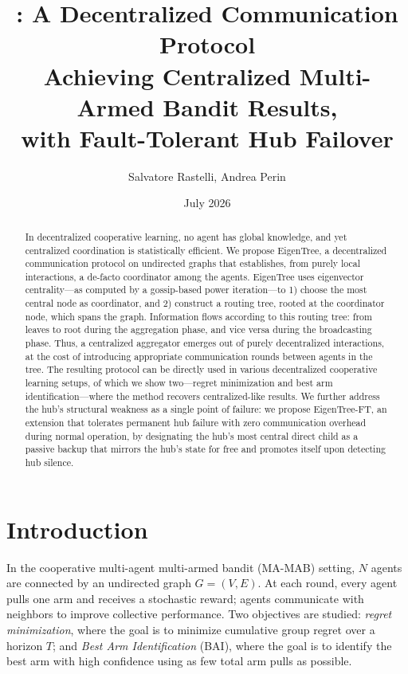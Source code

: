\documentclass{article}
\title{\merw: A Decentralized Communication Protocol\\Achieving Centralized Multi-Armed Bandit Results,\\with Fault-Tolerant Hub Failover}
\author{Salvatore Rastelli, Andrea Perin}
\date{July 2026}
\newcommand{\merw}{EigenTree}
\newcommand{\merwft}{EigenTree-FT}
\begin{document}
\maketitle

\begin{abstract}
	In decentralized cooperative learning, no agent has global knowledge, and yet centralized coordination is statistically efficient.
	We propose \merw{}, a decentralized communication protocol on undirected graphs that establishes, from purely local interactions, a de-facto coordinator among the agents.
	\merw{} uses eigenvector centrality---as computed by a gossip-based power iteration---to 1) choose the most central node as coordinator, and 2) construct a routing tree, rooted at the coordinator node, which spans the graph.
	Information flows according to this routing tree: from leaves to root during the aggregation phase, and vice versa during the broadcasting phase.
	Thus, a centralized aggregator emerges out of purely decentralized interactions, at the cost of introducing appropriate communication rounds between agents in the tree.
	The resulting protocol can be directly used in various decentralized cooperative learning setups, of which we show two---regret minimization and best arm identification---where the method recovers centralized-like results.
	We further address the hub's structural weakness as a single point of failure: we propose \merwft, an extension that tolerates permanent hub failure with zero communication overhead during normal operation, by designating the hub's most central direct child as a passive backup that mirrors the hub's state for free and promotes itself upon detecting hub silence.
\end{abstract}

\section{Introduction}

In the cooperative multi-agent multi-armed bandit (MA-MAB) setting, $N$ agents are connected by an undirected graph $G = (V, E)$. At each round, every agent pulls one arm and receives a stochastic reward; agents communicate with neighbors to improve collective performance. Two objectives are studied: \emph{regret minimization}, where the goal is to minimize cumulative group regret over a horizon $T$; and \emph{Best Arm Identification} (BAI), where the goal is to identify the best arm with high confidence using as few total arm pulls as possible.
\end{document}
